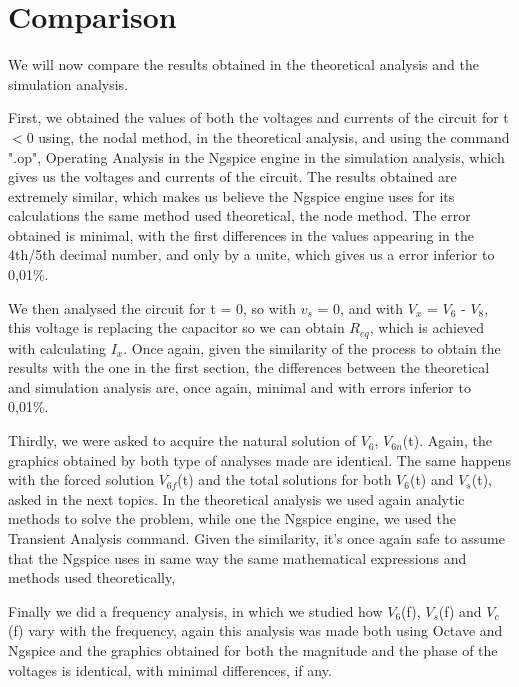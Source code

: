 \newpage
\section{Comparison}
\label{sec:comparison}
\par
We will now compare the results obtained in the theoretical analysis and the simulation analysis.\par


First, we obtained the values of both the voltages and currents of the circuit for t$<$0 using, the nodal method, in the theoretical analysis, and using the command ".op", Operating Analysis in the Ngspice engine in the simulation analysis, which gives us the voltages and currents of the circuit. The results obtained are extremely similar, which makes us believe the Ngspice engine uses for its calculations the same method used theoretical, the node method. The error obtained is minimal, with the first differences in the values appearing in the 4th/5th decimal number, and only by a unite, which gives us a error inferior to 0,01\%.
\par
We then analysed the circuit for t = 0, so with $v_s$ = 0, and with $V_x$ = $V_6$ - $V_8$, this voltage is replacing the capacitor so we can obtain $R_{eq}$, which is achieved with calculating $I_x$. Once again, given the similarity of the process to obtain the results with the one in the first section, the differences between the theoretical and simulation analysis are, once again, minimal and with errors inferior to 0,01\%.
\par
Thirdly, we were asked to acquire the natural solution of $V_6$, $V_{6n}$(t). Again, the graphics obtained by both type of analyses made are identical. The same happens with the forced solution $V_{6f}$(t) and the total solutions for both $V_6$(t) and $V_s$(t), asked in the next topics. In the theoretical analysis we used again analytic methods to solve the problem, while one the Ngspice engine, we used the Transient Analysis command. Given the similarity, it's once again safe to assume that the Ngspice uses in same way the same mathematical expressions and methods used theoretically,
\par
Finally we did a frequency analysis, in which we studied how $V_6$(f), $V_s$(f) and $V_c$(f) vary with the frequency, again this analysis was made both using Octave and Ngspice and the graphics obtained for both the magnitude and the phase of the voltages is identical, with minimal differences, if any.
\par





